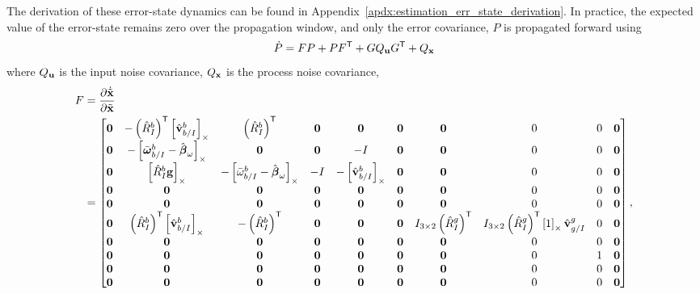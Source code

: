 The derivation of these error-state dynamics can be found in
Appendix~\ref{apdx:estimation_err_state_derivation}. In practice, the expected
value of the error-state remains zero over the propagation window, and only the
error covariance, $P$ is propagated forward using
\begin{equation}
  \dot{P} = FP + PF^\transpose + G Q_{\vect{u}} G^\transpose + Q_{\vect{x}}
\end{equation}
where $Q_{\vect{u}}$ is the input noise covariance, $Q_{\vect{x}}$ is the
process noise covariance,
\begin{align}
  F &= \frac{ \partial \dot{\tilde{\x}} }{ \partial \tilde{\x} } \\
    &=
    \begin{bmatrix}
      \vect{0} & - \left( \hat{R}_I^b \right)^\transpose
      \skewmat{\hat{\vect{v}}_{b/I}^b} & \left( \hat{R}_I^b \right)^\transpose &
      \vect{0} & \vect{0} & \vect{0} & \vect{0}
               & 0 & 0 & \vect{0} \\
      \vect{0} & -\skewmat{ \bar{\vect{\omega}}_{b/I}^b
      - \hat{\vect{\beta}}_\omega} & \vect{0} & \vect{0} & -I & \vect{0} & \vect{0}
               & 0 & 0 & \vect{0} \\
      \vect{0} & \skewmat{ \hat{R}_I^b \vect{g} } &
      -\skewmat{ \bar{\omega}_{b/I}^b - \hat{\vect{\beta}}_\omega } & -I &
      -\skewmat{ \hat{\vect{v}}_{b/I}^b } & \vect{0} & \vect{0}
               & 0 & 0 & \vect{0} \\
      \vect{0} & \vect{0} & \vect{0} & \vect{0} & \vect{0} & \vect{0} & \vect{0}
               & 0 & 0 & \vect{0} \\
      \vect{0} & \vect{0} & \vect{0} & \vect{0} & \vect{0} & \vect{0} & \vect{0}
               & 0 & 0 & \vect{0} \\
      \vect{0} & \left( \hat{R}_{I}^{b} \right)^\transpose
      \skewmat{ \hat{\vect{v}}_{b/I}^{b} } & 
      -\left( \hat{R}_{I}^{b} \right)^\transpose & \vect{0} & \vect{0} & \vect{0} & 
      I_{3 \times 2} \left( \hat{R}_{I}^{g} \right)^\transpose
               & I_{3 \times 2} \left( \hat{R}_{I}^{g} \right)^\transpose
               \skewmat{ 1 } \hat{\vect{v}}_{g/I}^g
               & 0 & \vect{0} \\
      \vect{0} & \vect{0} & \vect{0} & \vect{0} & \vect{0} & \vect{0} & \vect{0}
               & 0 & 0 & \vect{0} \\
      \vect{0} & \vect{0} & \vect{0} & \vect{0} & \vect{0} & \vect{0} & \vect{0}
               & 0 & 1 & \vect{0} \\
      \vect{0} & \vect{0} & \vect{0} & \vect{0} & \vect{0} & \vect{0} & \vect{0}
               & 0 & 0 & \vect{0} \\
      \vect{0} & \vect{0} & \vect{0} & \vect{0} & \vect{0} & \vect{0} & \vect{0}
               & 0 & 0 & \vect{0}
    \end{bmatrix},
\end{align}
